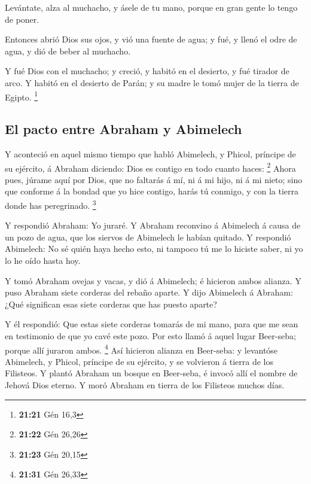  Levántate, alza al muchacho, y ásele de tu mano, porque
en gran gente lo tengo de poner.

 Entonces abrió Dios sus ojos, y vió una fuente de agua;
y fué, y llenó el odre de agua, y dió de beber al muchacho.

 Y fué Dios con el muchacho; y creció, y habitó en el
desierto, y fué tirador de arco.  Y habitó en el desierto
de Parán; y su madre le tomó mujer de la tierra de Egipto. \footnote{\textbf{21:21}
  Gén 16,3}

\hypertarget{el-pacto-entre-abraham-y-abimelech}{%
\subsection{El pacto entre Abraham y
Abimelech}\label{el-pacto-entre-abraham-y-abimelech}}

 Y aconteció en aquel mismo tiempo que habló Abimelech, y
Phicol, príncipe de su ejército, á Abraham diciendo: Dios es contigo en
todo cuanto haces: \footnote{\textbf{21:22} Gén 26,26} 
Ahora pues, júrame aquí por Dios, que no faltarás á mí, ni á mi hijo, ni
á mi nieto; sino que conforme á la bondad que yo hice contigo, harás tú
conmigo, y con la tierra donde has peregrinado. \footnote{\textbf{21:23}
  Gén 20,15}

 Y respondió Abraham: Yo juraré.  Y
Abraham reconvino á Abimelech á causa de un pozo de agua, que los
siervos de Abimelech le habían quitado.  Y respondió
Abimelech: No sé quién haya hecho esto, ni tampoco tú me lo hiciste
saber, ni yo lo he oído hasta hoy.

 Y tomó Abraham ovejas y vacas, y dió á Abimelech; é
hicieron ambos alianza.  Y puso Abraham siete corderas
del rebaño aparte.  Y dijo Abimelech á Abraham: ¿Qué
significan esas siete corderas que has puesto aparte?

 Y él respondió: Que estas siete corderas tomarás de mi
mano, para que me sean en testimonio de que yo cavé este pozo.
 Por esto llamó á aquel lugar Beer-seba; porque allí
juraron ambos. \footnote{\textbf{21:31} Gén 26,33}  Así
hicieron alianza en Beer-seba: y levantóse Abimelech, y Phicol, príncipe
de su ejército, y se volvieron á tierra de los Filisteos.
 Y plantó Abraham un bosque en Beer-seba, é invocó allí
el nombre de Jehová Dios eterno.  Y moró Abraham en
tierra de los Filisteos muchos días.

